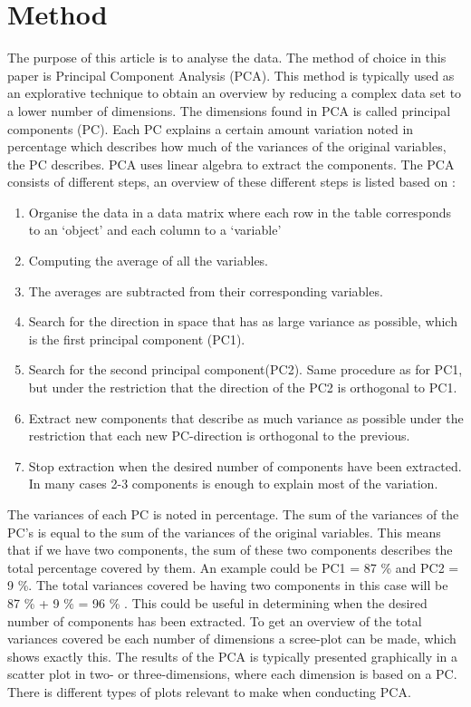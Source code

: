 \section*{Method}
\label{Method}
%
The purpose of this article is to analyse the data. The method of choice in this paper is Principal Component Analysis (PCA). This method is typically used as an explorative technique to obtain an overview by reducing a complex data set to a lower number of dimensions. The dimensions found in PCA is called principal components (PC). Each PC explains a certain amount variation noted in percentage which describes how much of the variances of the original variables, the PC describes.\blankline
%
PCA uses linear algebra to extract the components. The PCA consists of different steps, an overview of these different steps is listed based on \textcite[pp. 211-213]{Naes2010}:

\begin{enumerate}
	\item Organise the data in a data matrix where each row in the table corresponds to an ‘object’ and each column to a ‘variable’
	\item Computing the average of all the variables. 
	\item The averages are subtracted from their corresponding variables. 
	\item Search for the direction in space that has as large variance as possible, which is the first principal component (PC1).
	\item Search for the second principal component(PC2). Same procedure as for PC1, but under the restriction that the direction of the PC2 is orthogonal to PC1. 
	\item Extract new components that describe as much variance as possible under the restriction that each new PC-direction is orthogonal to the previous.
	\item Stop extraction when the desired number of components have been extracted. In many cases 2-3 components is enough to explain most of the variation. 
\end{enumerate}
\blankline
%
The variances of each PC is noted in percentage.
The sum of the variances of the PC's is equal to the sum of the variances of the original variables. This means that if we have two components, the sum of these two components describes the total percentage covered by them. An example could be PC1 = 87 \% and PC2 = 9 \%. The total variances covered be having two components in this case will be 87 \% + 9 \% = 96 \% \parencite[p. 213]{Naes2010}. This could be useful in determining when the desired number of components has been extracted. To get an overview of the total variances covered be each number of dimensions a scree-plot can be made, which shows exactly this. \blankline
%
The results of the PCA is typically presented graphically in a scatter plot in two- or three-dimensions, where each dimension is based on a PC. There is different types of plots relevant to make when conducting PCA. 


